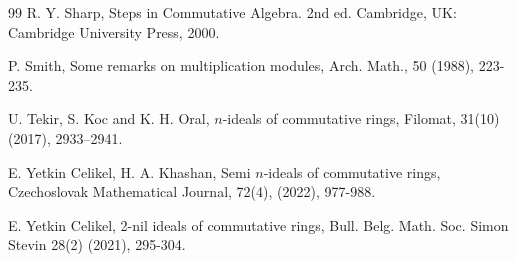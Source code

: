 \documentclass{amsart}%
\theoremstyle{plain}
\numberwithin{equation}{section}
\begin{document}
\begin{thebibliography}{99}
R. Y. Sharp, Steps in Commutative Algebra. 2nd ed. Cambridge,
UK: Cambridge University Press, 2000.

P. Smith, Some remarks on multiplication modules, Arch. Math.,
50 (1988), 223-235.

U. Tekir, S. Koc and K. H. Oral, $n$-ideals of commutative
rings, Filomat, 31(10) (2017), 2933--2941.

E. Yetkin Celikel, H. A. Khashan, Semi $n$-ideals of commutative
rings, Czechoslovak Mathematical Journal, 72(4), (2022), 977-988.

E. Yetkin Celikel, 2-nil ideals of commutative rings, Bull.
Belg. Math. Soc. Simon Stevin 28(2) (2021), 295-304.
\end{thebibliography}
\end{document}

